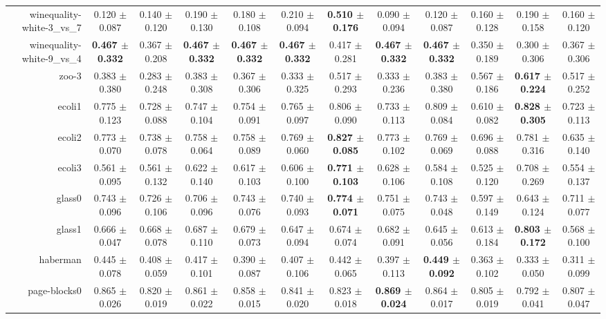 \begin{table}[!ht]
{\begin{tabular}{r c c c c c c c c c c c}
winequality-white-3\_vs\_7 & 0.120 $\pm$ 0.087 & 0.140 $\pm$ 0.120 & 0.190 $\pm$ 0.130 & 0.180 $\pm$ 0.108 & 0.210 $\pm$ 0.094 & \textbf{0.510 $\pm$ 0.176} & 0.090 $\pm$ 0.094 & 0.120 $\pm$ 0.087 & 0.160 $\pm$ 0.128 & 0.190 $\pm$ 0.158 & 0.160 $\pm$ 0.120 \\
winequality-white-9\_vs\_4 & \textbf{0.467 $\pm$ 0.332} & 0.367 $\pm$ 0.208 & \textbf{0.467 $\pm$ 0.332} & \textbf{0.467 $\pm$ 0.332} & \textbf{0.467 $\pm$ 0.332} & 0.417 $\pm$ 0.281 & \textbf{0.467 $\pm$ 0.332} & \textbf{0.467 $\pm$ 0.332} & 0.350 $\pm$ 0.189 & 0.300 $\pm$ 0.306 & 0.367 $\pm$ 0.306 \\
zoo-3 & 0.383 $\pm$ 0.380 & 0.283 $\pm$ 0.248 & 0.383 $\pm$ 0.308 & 0.367 $\pm$ 0.306 & 0.333 $\pm$ 0.325 & 0.517 $\pm$ 0.293 & 0.333 $\pm$ 0.236 & 0.383 $\pm$ 0.380 & 0.567 $\pm$ 0.186 & \textbf{0.617 $\pm$ 0.224} & 0.517 $\pm$ 0.252 \\
ecoli1 & 0.775 $\pm$ 0.123 & 0.728 $\pm$ 0.088 & 0.747 $\pm$ 0.104 & 0.754 $\pm$ 0.091 & 0.765 $\pm$ 0.097 & 0.806 $\pm$ 0.090 & 0.733 $\pm$ 0.113 & 0.809 $\pm$ 0.084 & 0.610 $\pm$ 0.082 & \textbf{0.828 $\pm$ 0.305} & 0.723 $\pm$ 0.113 \\
ecoli2 & 0.773 $\pm$ 0.070 & 0.738 $\pm$ 0.078 & 0.758 $\pm$ 0.064 & 0.758 $\pm$ 0.089 & 0.769 $\pm$ 0.060 & \textbf{0.827 $\pm$ 0.085} & 0.773 $\pm$ 0.102 & 0.769 $\pm$ 0.069 & 0.696 $\pm$ 0.088 & 0.781 $\pm$ 0.316 & 0.635 $\pm$ 0.140 \\
ecoli3 & 0.561 $\pm$ 0.095 & 0.561 $\pm$ 0.132 & 0.622 $\pm$ 0.140 & 0.617 $\pm$ 0.103 & 0.606 $\pm$ 0.100 & \textbf{0.771 $\pm$ 0.103} & 0.628 $\pm$ 0.106 & 0.584 $\pm$ 0.108 & 0.525 $\pm$ 0.120 & 0.708 $\pm$ 0.269 & 0.554 $\pm$ 0.137 \\
glass0 & 0.743 $\pm$ 0.096 & 0.726 $\pm$ 0.106 & 0.706 $\pm$ 0.096 & 0.743 $\pm$ 0.076 & 0.740 $\pm$ 0.093 & \textbf{0.774 $\pm$ 0.071} & 0.751 $\pm$ 0.075 & 0.743 $\pm$ 0.048 & 0.597 $\pm$ 0.149 & 0.643 $\pm$ 0.124 & 0.711 $\pm$ 0.077 \\
glass1 & 0.666 $\pm$ 0.047 & 0.668 $\pm$ 0.078 & 0.687 $\pm$ 0.110 & 0.679 $\pm$ 0.073 & 0.647 $\pm$ 0.094 & 0.674 $\pm$ 0.074 & 0.682 $\pm$ 0.091 & 0.645 $\pm$ 0.056 & 0.613 $\pm$ 0.184 & \textbf{0.803 $\pm$ 0.172} & 0.568 $\pm$ 0.100 \\
haberman & 0.445 $\pm$ 0.078 & 0.408 $\pm$ 0.059 & 0.417 $\pm$ 0.101 & 0.390 $\pm$ 0.087 & 0.407 $\pm$ 0.106 & 0.442 $\pm$ 0.065 & 0.397 $\pm$ 0.113 & \textbf{0.449 $\pm$ 0.092} & 0.363 $\pm$ 0.102 & 0.333 $\pm$ 0.050 & 0.311 $\pm$ 0.099 \\
page-blocks0 & 0.865 $\pm$ 0.026 & 0.820 $\pm$ 0.019 & 0.861 $\pm$ 0.022 & 0.858 $\pm$ 0.015 & 0.841 $\pm$ 0.020 & 0.823 $\pm$ 0.018 & \textbf{0.869 $\pm$ 0.024} & 0.864 $\pm$ 0.017 & 0.805 $\pm$ 0.019 & 0.792 $\pm$ 0.041 & 0.807 $\pm$ 0.047 \\

\end{tabular}}
\end{table}

